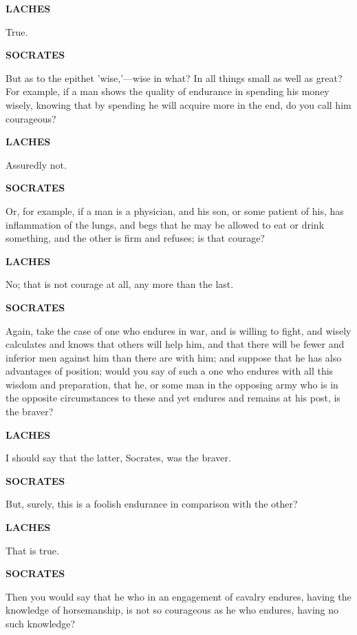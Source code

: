 \documentclass[11pt,letter]{book}
\begin{document}
\par \textbf{LACHES}
\par   True.

\par \textbf{SOCRATES}
\par   But as to the epithet 'wise,'—wise in what? In all things small as well as great? For example, if a man shows the quality of endurance in spending his money wisely, knowing that by spending he will acquire more in the end, do you call him courageous?

\par \textbf{LACHES}
\par   Assuredly not.

\par \textbf{SOCRATES}
\par   Or, for example, if a man is a physician, and his son, or some patient of his, has inflammation of the lungs, and begs that he may be allowed to eat or drink something, and the other is firm and refuses; is that courage?

\par \textbf{LACHES}
\par   No; that is not courage at all, any more than the last.

\par \textbf{SOCRATES}
\par   Again, take the case of one who endures in war, and is willing to fight, and wisely calculates and knows that others will help him, and that there will be fewer and inferior men against him than there are with him; and suppose that he has also advantages of position; would you say of such a one who endures with all this wisdom and preparation, that he, or some man in the opposing army who is in the opposite circumstances to these and yet endures and remains at his post, is the braver?

\par \textbf{LACHES}
\par   I should say that the latter, Socrates, was the braver.

\par \textbf{SOCRATES}
\par   But, surely, this is a foolish endurance in comparison with the other?

\par \textbf{LACHES}
\par   That is true.

\par \textbf{SOCRATES}
\par   Then you would say that he who in an engagement of cavalry endures, having the knowledge of horsemanship, is not so courageous as he who endures, having no such knowledge?
\end{document}
